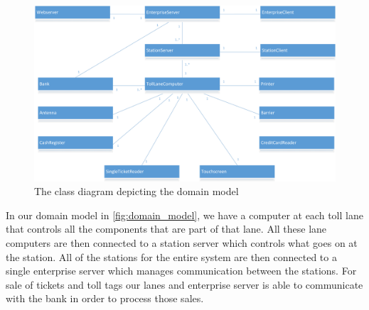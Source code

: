 \begin{figure}
\centering
\includegraphics[width=1\textwidth]{img/domain_model/domain_model.png}
\caption{The class diagram depicting the domain model}
\label{fig:domain_model}
\end{figure}

In our domain model in {\autoref{fig:domain_model}}, we have a computer at each toll lane that controls all the components that are part of that lane. All these lane computers are then connected to a station server which controls what goes on at the station. All of the stations for the entire system are then connected to a single enterprise server which manages communication between the stations. For sale of tickets and toll tags our lanes and enterprise server is able to communicate with the bank in order to process those sales.